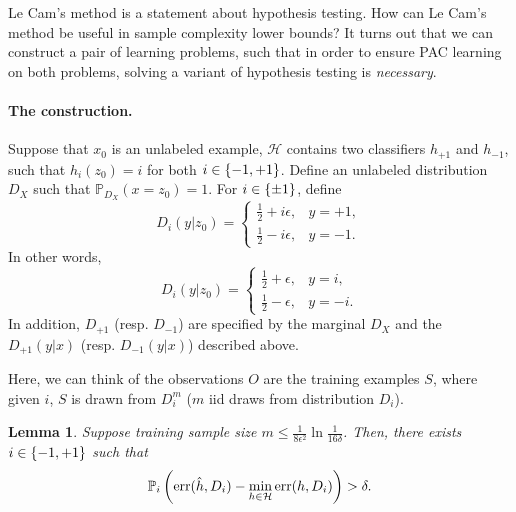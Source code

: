 \documentclass{article}
\newtheorem{lemma}{Lemma}
\DeclareMathOperator*{\err}{{\rm err}}
\DeclareMathOperator*{\Acal}{{\cal A}}
\newcommand{\PP}{\mathbb{P}}
\newcommand{\Hcal}{\mathcal{H}}
\begin{document}
Le Cam's method is a statement about hypothesis testing.
How can Le Cam's method be useful in sample complexity lower bounds? It turns out
that we can construct a pair of learning problems, such that in order to ensure PAC
learning on both problems, solving a variant of hypothesis testing is {\em necessary}.

\paragraph{The construction.} Suppose that $x_0$ is an unlabeled example, $\Hcal$ contains two classifiers $h_{+1}$ and $h_{-1}$, such that $h_i(z_0) = i$ for both $i \in \cbr{-1,+1}$. Define an unlabeled distribution $D_X$ such that $\PP_{D_X}(x=z_0) = 1$. For $i \in \cbr{\pm 1}$, define
\[ D_i(y|z_0) = \begin{cases} \frac12 + i\epsilon, & y = +1, \\ \frac12 - i\epsilon, & y = -1. \end{cases} \]
In other words,
\[ D_i(y|z_0) = \begin{cases} \frac12 + \epsilon, & y = i, \\ \frac12 - \epsilon, & y = -i.
\end{cases}\]
In addition, $D_{+1}$ (resp. $D_{-1}$) are specified by the marginal $D_X$ and the $D_{+1}(y|x)$ (resp. $D_{-1}(y|x)$) described above.

Here, we can think of the observations $O$ are the training examples $S$, where given $i$, $S$ is drawn from $D_i^m$ ($m$ iid draws from distribution $D_i$).



\begin{lemma}
Suppose training sample size $m \leq \frac{1}{8\epsilon^2}\ln\frac1{16\delta}$.
Then, there exists $i \in \cbr{-1,+1}$ such that
\[ \PP_i\del{\err(\hat{h}, D_i) - \min_{h \in \Hcal} \err(h, D_i) } > \delta. \]
\end{lemma}
\end{document}
